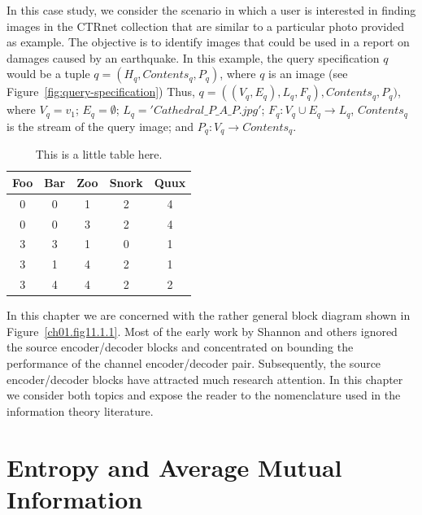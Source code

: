 In this case study, we consider the scenario in which a user is interested in finding images in the CTRnet collection that are similar to a particular photo provided as example. The objective is to identify images that could be used in a report on damages caused by an earthquake.
In this example, the query specification $q$ would be a tuple $q = (H_q, Contents_q, P_q)$, where $q$ is an image (see Figure~\ref{fig:query-specification})
 Thus, $q =
((V_q, E_q), L_q, F_q), Contents_q, P_q)$, where $V_q = {v_1}$; $E_q =\emptyset$; $L_q={' Cathedral\_P\_A\_P.jpg'}$; $F_q: V_q\cup E_q
\rightarrow L_q$, $Contents_q$ is the stream of the query image; and $P_q: V_q
\rightarrow Contents_q$.

\begin{table}
\caption{This is a little table here.}
\label{tab:coordinates}
\begin{tabular}{ccccc}
\hline
Foo& Bar& Zoo& Snork& Quux\\
\hline
 0 & 0 & 1 & 2 & 4\\
 0 & 0 & 3 & 2 & 4\\
 3 & 3 & 1 & 0 & 1\\
 3 & 1 & 4 & 2 & 1\\
 3 & 4 & 4 & 2 & 2\\
\end{tabular}
\end{table}

In this chapter we are concerned with the rather general block diagram
shown in Figure~\ref{ch01.fig11.1.1}. Most of the early work by
Shannon and others ignored the source  encoder/decoder blocks and
concentrated  on bounding the performance of the channel
encoder/decoder pair. Subsequently, the source  encoder/decoder blocks
have attracted much research attention.  In this chapter we consider
both topics and expose the reader to the nomenclature used in the
information theory literature.

\section{Entropy and Average Mutual Information}
\label{ch01.sec11.2}

